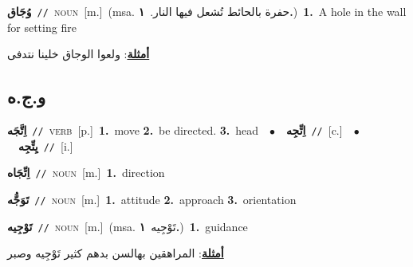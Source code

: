\documentclass[10pt,a4paper,twoside]{article} %
\begin{document}
\begin{multicols}{2}
{\setlength\topsep{0pt}\textbf{\foreignlanguage{arabic}{وُجَاق}}\ {\color{gray}\texttt{//}\color{black}}\ \textsc{noun}\ [m.]\ \color{gray}(msa. \foreignlanguage{arabic}{حفرة بالحائط تُشعل فيها النار.}~\foreignlanguage{arabic}{\textbf{١.}})\color{black}\ \textbf{1.}~A hole in the wall for setting fire\  \begin{flushright}\color{gray}\foreignlanguage{arabic}{\textbf{\underline{\foreignlanguage{arabic}{أمثلة}}}: ولعوا الوجاق خلينا نتدفى}\end{flushright}\color{black}} \vspace{2mm}

\vspace{-3mm}
\subsection*{\color{blue}\foreignlanguage{arabic}{و.ج.ه}\color{blue}{}} 

{\setlength\topsep{0pt}\textbf{\foreignlanguage{arabic}{اِتَّجَه}}\ {\color{gray}\texttt{//}\color{black}}\ \textsc{verb}\ [p.]\ \textbf{1.}~move  \textbf{2.}~be directed.  \textbf{3.}~head\ \ $\bullet$\ \ \setlength\topsep{0pt}\textbf{\foreignlanguage{arabic}{اِتِّجِه}}\ {\color{gray}\texttt{//}\color{black}}\ [c.]\ \ $\bullet$\ \ \setlength\topsep{0pt}\textbf{\foreignlanguage{arabic}{يِتِّجِه}}\ {\color{gray}\texttt{//}\color{black}}\ [i.]\ } \vspace{2mm}

{\setlength\topsep{0pt}\textbf{\foreignlanguage{arabic}{اِتِّجَاه}}\ {\color{gray}\texttt{//}\color{black}}\ \textsc{noun}\ [m.]\ \textbf{1.}~direction\ } \vspace{2mm}

{\setlength\topsep{0pt}\textbf{\foreignlanguage{arabic}{تَوَجُّه}}\ {\color{gray}\texttt{//}\color{black}}\ \textsc{noun}\ [m.]\ \textbf{1.}~attitude  \textbf{2.}~approach  \textbf{3.}~orientation\ } \vspace{2mm}

{\setlength\topsep{0pt}\textbf{\foreignlanguage{arabic}{تَوْجِيه}}\ {\color{gray}\texttt{//}\color{black}}\ \textsc{noun}\ [m.]\ \color{gray}(msa. \foreignlanguage{arabic}{تَوْجِيه}~\foreignlanguage{arabic}{\textbf{١.}})\color{black}\ \textbf{1.}~guidance\  \begin{flushright}\color{gray}\foreignlanguage{arabic}{\textbf{\underline{\foreignlanguage{arabic}{أمثلة}}}: المراهقين بهالسن بدهم كثير تَوْجِيه وصبر}\end{flushright}\color{black}} \vspace{2mm}


\end{multicols}
\end{document}
